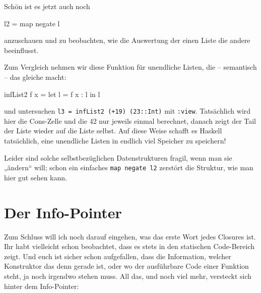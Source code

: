 \documentclass[11pt,DIV=12,parskip=half,headings=normal,abstract]{scrartcl}
\newcommand{\li}{\lstinline[style=haskell]}
\begin{document}
Schön ist es jetzt auch noch
\begin{haskell}
l2 = map negate l
\end{haskell}
anzuschauen und zu beobachten, wie die Auswertung der einen Liste die andere beeinflusst.

Zum Vergleich nehmen wir diese Funktion für unendliche Listen, die -- semantisch -- das gleiche macht:
\begin{haskell}
infList2 f x = let l = f x : l in l
\end{haskell}
und untersuchen \li-l3 = infList2 (+19) (23::Int)- mit \li-:view-. Tatsächlich wird hier die Cons-Zelle und die 42 nur jeweils einmal berechnet, danach zeigt der Tail der Liste wieder auf die Liste selbst. Auf diese Weise schafft es Haskell tatsächlich, eine unendliche Listen in endlich viel Speicher zu speichern!

Leider sind solche selbstbezüglichen Datenstrukturen fragil, wenn man sie „ändern“ will; schon ein einfaches \li-map negate l2- zerstört die Struktur, wie man hier gut sehen kann.



\section{Der Info-Pointer}

Zum Schluss will ich noch darauf eingehen, was das erste Wort jedes Closures ist. Ihr habt vielleicht schon beobachtet, dass es stets in den statischen Code-Bereich zeigt. Und euch ist sicher schon aufgefallen, dass die Information, welcher Konstruktor das denn gerade ist, oder wo der ausführbare Code einer Funktion steht, ja noch irgendwo stehen muss. All das, und noch viel mehr, versteckt sich hinter dem Info-Pointer:

\def\ux{2.8cm}\def\uy{0.6cm}
\begin{center}
\end{center}
\end{document}
